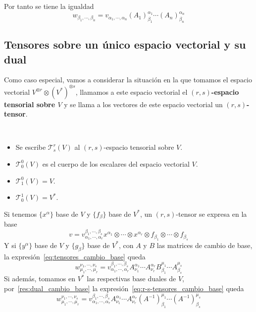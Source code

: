 Por tanto se tiene la igualdad
\begin{equation}
  \label{eq:tensores_cambio_base}
  w_{\beta_1,\cdots,\beta_n}=v_{\alpha_1,\cdots,\alpha_n}(A_1)^{\alpha_1}_{\beta_1}\cdots (A_n)^{\alpha_n}_{\beta_n}
\end{equation}

\subsection{Tensores sobre un único espacio vectorial y su
dual}\label{subsec:tensores-sobre-un-unico-espacio-vectorial-y-su-dual}
Como caso especial, vamos a considerar la situación en la que tomamos el espacio vectorial
$V^{\otimes r}\otimes (V^*)^{\otimes s}$, llamamos a este espacio vectorial el \textbf{$(r,s)$-espacio tensorial sobre $V$}
y se llama a los vectores de este espacio vectorial un \textbf{$(r,s)$-tensor}.
\begin{notation}
  \
  \begin{itemize}
    \item Se escribe $\mathcal{T}^r_s(V)$ al $(r,s)$-espacio tensorial sobre $V$.
    \item $\mathcal{T}^0_0(V)$ es el cuerpo de los escalares del espacio vectorial $V$.
    \item $\mathcal{T}^0_1(V) = V$.
    \item $\mathcal{T}^1_0(V)=V^*$.
  \end{itemize}
\end{notation}

Si tenemos $\{x^\alpha\}$ base de $V$ y $\{f_\beta\}$ base de $V^*$, un $(r,s)$-tensor se expresa en la base
\begin{equation}
  \label{eq:r-s-tensor-componentes}
  v=v_{\alpha_1,\cdots,\alpha_r}^{\beta_1,\cdots, \beta_s} x^{\alpha_1}\otimes\cdots\otimes x^{\alpha_r}\otimes f_{\beta_1}\otimes\cdots\otimes f_{\beta_s}
\end{equation}
Y si $\{y^\alpha\}$ base de $V$ y $\{g_\beta\}$ base de $V^*$, con $A$ y $B$ las matrices de cambio de base, la expresión~\ref{eq:tensores_cambio_base}
queda
\begin{equation}
  \label{eq:r-s-tensores_cambio_base}
  w_{\mu_1,\cdots,\mu_r}^{\nu_1,\cdots, \nu_s}=v_{\alpha_1,\cdots,\alpha_r}^{\beta_1,\cdots, \beta_s}A^{\alpha_1}_{\nu_1}\cdots A^{\alpha_r}_{\nu_r}B_{\beta_1}^{\mu_1}\cdots A_{\beta_s}^{\mu_s}
\end{equation}
Si además, tomamos en $V^*$ las respectivas base duales de $V$, por~\ref{res:dual_cambio_base} la expresión~\ref{eq:r-s-tensores_cambio_base}
queda
\begin{equation}
  \label{eq:r-s-tensores_cambio_base_dual}
  w_{\mu_1,\cdots,\mu_r}^{\nu_1,\cdots, \nu_s}=v_{\alpha_1,\cdots,\alpha_r}^{\beta_1,\cdots, \beta_s}A^{\alpha_1}_{\nu_1}\cdots A^{\alpha_r}_{\nu_r}(A^{-1})_{\beta_1}^{\mu_1}\cdots (A^{-1})_{\beta_s}^{\mu_s}
\end{equation}